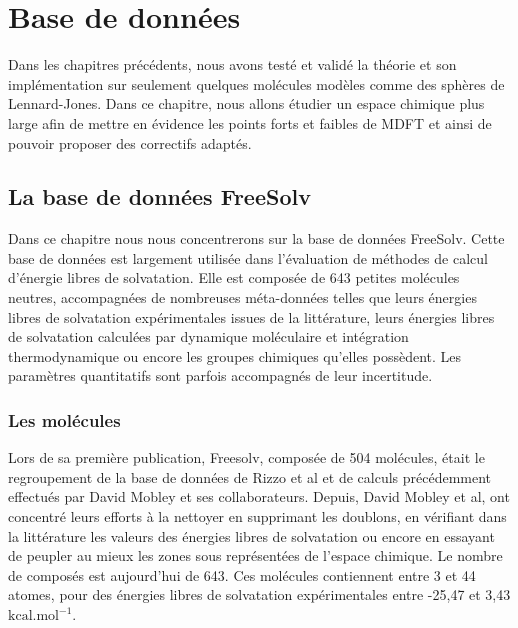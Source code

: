 \chapter{Base de données}
\label{chap:BDD}



Dans les chapitres précédents, nous avons testé et validé la théorie et son implémentation sur seulement quelques molécules modèles comme des sphères de Lennard-Jones. Dans ce chapitre, nous allons étudier un espace chimique plus large afin de mettre en évidence les points forts et faibles de MDFT et ainsi de pouvoir proposer des correctifs adaptés.



\section{La base de données FreeSolv}
Dans ce chapitre nous nous concentrerons sur la base de données FreeSolv\cite{Mobley_small_2009}. Cette base de données est largement utilisée dans l'évaluation de méthodes de calcul d'énergie libres de solvatation. Elle est composée de 643 petites molécules neutres, accompagnées de nombreuses méta-données telles que leurs énergies libres de solvatation expérimentales issues de la littérature, leurs énergies libres de solvatation calculées par dynamique moléculaire et intégration thermodynamique ou encore les groupes chimiques qu'elles possèdent. Les paramètres quantitatifs sont parfois accompagnés de leur incertitude.

\subsection{Les molécules}
Lors de sa première publication, Freesolv, composée de 504 molécules, était le regroupement de la base de données de Rizzo et al\cite{Rizzo_estimation_2006} et de calculs précédemment effectués par David Mobley et ses collaborateurs. Depuis, David Mobley et al, ont concentré leurs efforts à la nettoyer\cite{Mobley_small_2009, Mobley_treating_2008, Mobley_comparison_2007, Mobley_predictions_2009, Beckstein_prediction_2011, Mobley_alchemical_2011, Mobley_blind_2014, Mobley_freesolv_2014, DuarteRamosMatos_approaches_2017} en supprimant les doublons, en vérifiant dans la littérature les valeurs des énergies libres de solvatation ou encore en essayant de peupler au mieux les zones sous représentées de l'espace chimique. Le nombre de composés est aujourd'hui de 643. Ces molécules contiennent entre 3 et 44 atomes, pour des énergies libres de solvatation expérimentales entre -25,47 et 3,43 $\mathrm{kcal}.\mathrm{mol}^{-1}$. 

